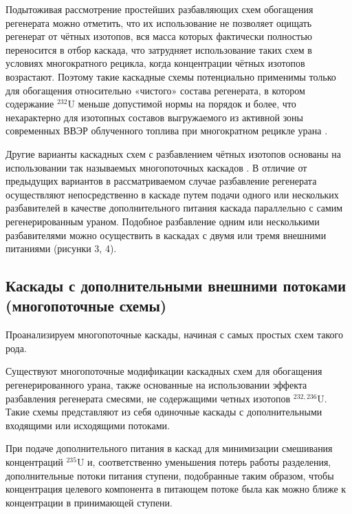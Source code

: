 Подытоживая рассмотрение простейших разбавляющих схем обогащения регенерата можно отметить, что их использование не позволяет оцищать регенерат от чётных изотопов, вся масса которых фактически полностью переносится в отбор каскада, что затрудняет использование таких схем в условиях многократного рецикла, когда концентрации чётных изотопов возрастают. Поэтому такие каскадные схемы потенциально применимы только для обогащения относительно «чистого» состава регенерата, в котором содержание $^{232}$U меньше допустимой нормы на порядок и более, что нехарактерно для изотопных составов выгружаемого из активной зоны современных ВВЭР облученного топлива при многократном рецикле урана \cite{bormanTehnikoekonomicheskiyAnalizVozmozhnyh2012}. 

Другие варианты каскадных схем с разбавлением чётных изотопов основаны на использовании так называемых многопоточных каскадов \cite{sulaberidzeQuasiidealCascadesAdditional2006}. В отличие от предыдущих вариантов в рассматриваемом случае разбавление регенерата осуществляют непосредственно в каскаде путем подачи одного или нескольких разбавителей в качестве дополнительного питания каскада параллельно с самим регенерированным ураном. Подобное разбавление одним или несколькими разбавителями можно осуществить в каскадах с двумя или тремя внешними питаниями (рисунки 3, 4).


\subsection{Каскады с дополнительными внешними потоками (многопоточные схемы)}

Проанализируем многопоточные каскады, начиная с самых простых схем такого рода.

Существуют многопоточные модификации каскадных схем для обогащения регенерированного урана, также основанные на использовании эффекта разбавления регенерата смесями, не содержащими четных изотопов $^{232,236}$U. Такие схемы представляют из себя одиночные каскады с дополнительными входящими или исходящими потоками.

При подаче дополнительного питания в каскад для минимизации смешивания концентраций $^{235}$U и, соответственно уменьшения потерь работы разделения, дополнительные потоки питания ступени, подобранные таким образом, чтобы концентрация целевого компонента в питающем потоке была как можно ближе к концентрации в принимающей ступени. 

